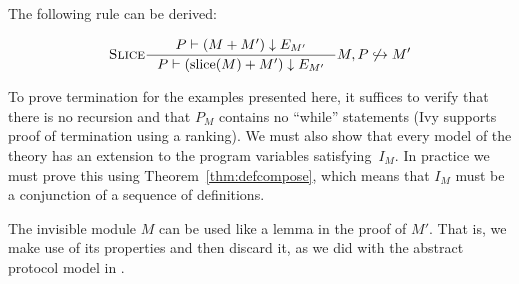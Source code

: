 \begin{theorem}
The following rule can be derived:
\begin{small}
\[{\irule{Slice}\inference{ P \vdash (M \Comp M') \Restr E_{M'} }
            { P \vdash (\Slice{M} \Comp M') \Restr E_{M'} }} {M,P \not \hookrightarrow M'} \]
\end{small}
\end{theorem}


To prove termination for the examples presented here, it suffices to verify that there is no recursion
and that $P_M$ contains no ``while'' statements (Ivy supports proof of termination using a ranking).
We must also show that every model of the theory
has an extension to the program variables satisfying~$I_M$. In practice we must prove this using
Theorem~\ref{thm:defcompose}, which means that $I_M$ must be a conjunction of a sequence of definitions.

The invisible module $M$ can be used like a lemma in the proof of
$M'$. That is, we make use of its properties and then discard
it, as we did with the abstract protocol model in \Toy.



